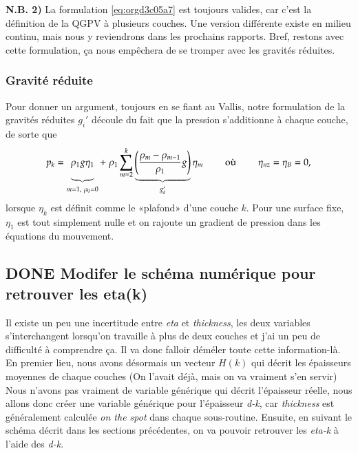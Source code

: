 \documentclass{article}
\numberwithin{equation}{section}
\newcommand{\bigno}{\vphantom{\qty(\frac{d}{q})}}
\begin{document}
\textbf{N.B. 2)} La formulation \ref{eq:orgd3c05a7} est toujours valides, car c'est la définition de la QGPV à plusieurs couches.
Une version différente existe en milieu continu, mais nous y reviendrons dans les prochains rapports.
Bref, restons avec cette formulation, ça nous empêchera de se tromper avec les gravités réduites.

\subsubsection{Gravité réduite}
\label{sec:org2f760b4}

Pour donner un argument, toujours en se fiant au Vallis, notre formulation de la gravités réduites \(g_i'\) découle du fait que la pression s'additionne à chaque couche, de sorte que 
\begin{equation}
p_{k} = \underbrace{\rho_1 g \eta_1\bigno}_{m=1,\ \rho_0=0} + \ \rho_1 \sum_{m=2}^k \underbrace{\qty(\frac{\rho_m - \rho_{m-1}}{\rho_1} g)}_{g_k'} \eta_m
\hspace{0.8cm} \text{où}\hspace{0.8cm}
\eta_{nz} = \eta_B = 0,
\end{equation}
lorsque \(\eta_k\) est définit comme le «plafond» d'une couche \(k\).
Pour une surface fixe, \(\eta_1\) est tout simplement nulle et on rajoute un gradient de pression dans les équations du mouvement.

\subsection{{\bfseries\sffamily DONE} Modifer le schéma numérique pour retrouver les eta(k)}
\label{sec:orgf8a6f2d}
Il existe un peu une incertitude entre \emph{eta} et \emph{thickness}, les deux variables s'interchangent lorsqu'on travaille à plus de deux couches et j'ai un peu de difficulté à comprendre ça.
Il va donc falloir déméler toute cette information-là.
En premier lieu, nous avons désormais un vecteur \(H(k)\) qui décrit les épaisseurs moyennes de chaque couches (On l'avait déjà, mais on va vraiment s'en servir)
Nous n'avons pas vraiment de variable générique qui décrit l'épaisseur réelle, nous allons donc créer une variable générique pour l'épaisseur \emph{d-k}, car \emph{thickness} est généralement calculée \emph{on the spot} dans chaque sous-routine.
Ensuite, en suivant le schéma décrit dans les sections précédentes, on va pouvoir retrouver les \emph{eta-k} à l'aide des \emph{d-k}.\\[0pt]
\end{document}
